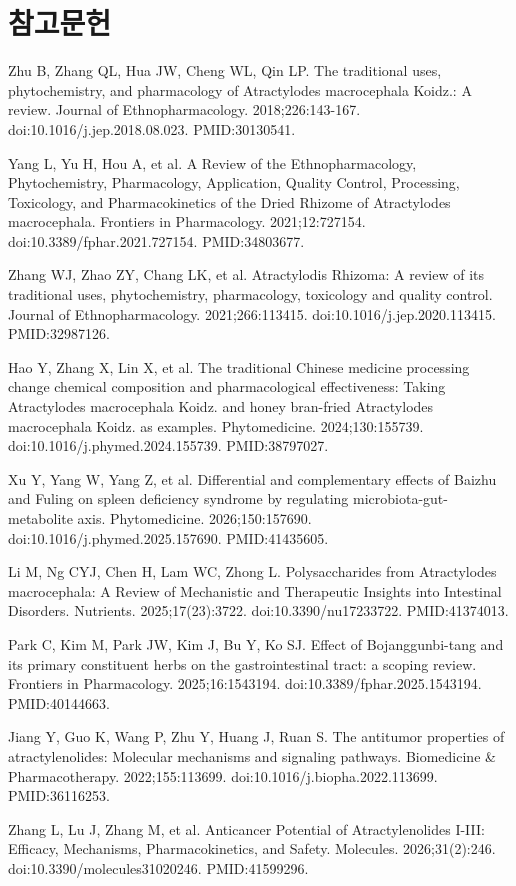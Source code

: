 \documentclass[11pt,oneside]{book}
\newcommand{\refstart}{\par\begingroup\footnotesize\setlength{\parskip}{2.5pt}\raggedright}
\newcommand{\reff}[2]{\par\hangindent=7mm\hangafter=1\noindent[#1]\hspace{2mm}#2\par}
\begin{document}
\section*{참고문헌}
\refstart
\reff{1}{Zhu B, Zhang QL, Hua JW, Cheng WL, Qin LP. The traditional uses, phytochemistry, and pharmacology of Atractylodes macrocephala Koidz.: A review. Journal of Ethnopharmacology. 2018;226:143-167. doi:10.1016/j.jep.2018.08.023. PMID:30130541.}
\reff{2}{Yang L, Yu H, Hou A, et al. A Review of the Ethnopharmacology, Phytochemistry, Pharmacology, Application, Quality Control, Processing, Toxicology, and Pharmacokinetics of the Dried Rhizome of Atractylodes macrocephala. Frontiers in Pharmacology. 2021;12:727154. doi:10.3389/fphar.2021.727154. PMID:34803677.}
\reff{3}{Zhang WJ, Zhao ZY, Chang LK, et al. Atractylodis Rhizoma: A review of its traditional uses, phytochemistry, pharmacology, toxicology and quality control. Journal of Ethnopharmacology. 2021;266:113415. doi:10.1016/j.jep.2020.113415. PMID:32987126.}
\reff{4}{Hao Y, Zhang X, Lin X, et al. The traditional Chinese medicine processing change chemical composition and pharmacological effectiveness: Taking Atractylodes macrocephala Koidz. and honey bran-fried Atractylodes macrocephala Koidz. as examples. Phytomedicine. 2024;130:155739. doi:10.1016/j.phymed.2024.155739. PMID:38797027.}
\reff{5}{Xu Y, Yang W, Yang Z, et al. Differential and complementary effects of Baizhu and Fuling on spleen deficiency syndrome by regulating microbiota-gut-metabolite axis. Phytomedicine. 2026;150:157690. doi:10.1016/j.phymed.2025.157690. PMID:41435605.}
\reff{6}{Li M, Ng CYJ, Chen H, Lam WC, Zhong L. Polysaccharides from Atractylodes macrocephala: A Review of Mechanistic and Therapeutic Insights into Intestinal Disorders. Nutrients. 2025;17(23):3722. doi:10.3390/nu17233722. PMID:41374013.}
\reff{7}{Park C, Kim M, Park JW, Kim J, Bu Y, Ko SJ. Effect of Bojanggunbi-tang and its primary constituent herbs on the gastrointestinal tract: a scoping review. Frontiers in Pharmacology. 2025;16:1543194. doi:10.3389/fphar.2025.1543194. PMID:40144663.}
\reff{8}{Jiang Y, Guo K, Wang P, Zhu Y, Huang J, Ruan S. The antitumor properties of atractylenolides: Molecular mechanisms and signaling pathways. Biomedicine \& Pharmacotherapy. 2022;155:113699. doi:10.1016/j.biopha.2022.113699. PMID:36116253.}
\reff{9}{Zhang L, Lu J, Zhang M, et al. Anticancer Potential of Atractylenolides I-III: Efficacy, Mechanisms, Pharmacokinetics, and Safety. Molecules. 2026;31(2):246. doi:10.3390/molecules31020246. PMID:41599296.}
\end{document}
